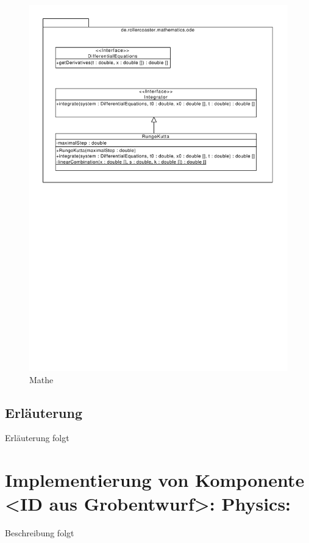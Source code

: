 \begin{figure}
\includegraphics[width=\linewidth]{bilder/Mathematics_ODE}
\caption{Mathe}
\end{figure}

\subsection{Erläuterung}

Erläuterung folgt

\section{Implementierung von Komponente
         <ID aus Grobentwurf>: Physics:}

Beschreibung folgt

